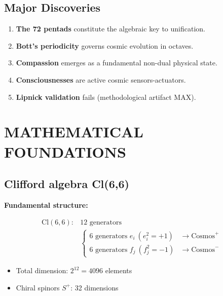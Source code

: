 \documentclass[11pt]{article}
\providecommand{\tightlist}{%
\setlength{\itemsep}{2pt}\setlength{\parskip}{6pt}
}
\begin{document}
\hypertarget{major-discoveries}{%
\subsection{Major Discoveries}\label{major-discoveries}}

\begin{enumerate}
\def\labelenumi{\arabic{enumi}.}
\tightlist
\item
  \textbf{The 72 pentads} constitute the algebraic key to unification.
\item
  \textbf{Bott's periodicity} governs cosmic evolution in octaves.
\item
  \textbf{Compassion} emerges as a fundamental non-dual physical state.
\item
  \textbf{Consciousnesses} are active cosmic sensors-actuators.
\item
  \textbf{Lipnick validation} fails (methodological artifact MAX).
\end{enumerate}

\hypertarget{mathematical-foundations-1}{%
\section{MATHEMATICAL FOUNDATIONS}\label{mathematical-foundations-1}}

\hypertarget{clifford-algebra-cl66}{%
\subsection{Clifford algebra Cl(6,6)}\label{clifford-algebra-cl66}}

\textbf{Fundamental structure:}

\begin{align*}
\text{Cl}(6,6) : & \text{12 generators} \\
& \begin{cases}
6 \text{ generators } e_i\ (e_i^2 = +1) & \rightarrow \text{Cosmos}^{+} \\
6 \text{ generators } f_j\ (f_j^2 = -1) & \rightarrow \text{Cosmos}^{-}
\end{cases}
\end{align*}

\begin{itemize}
\tightlist
\item
  Total dimension: \(2^{12} = 4096\) elements
\item
  Chiral spinors \(S^{+}\): 32 dimensions
\end{itemize}
\end{document}
